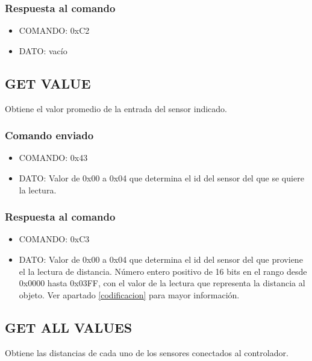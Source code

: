 \documentclass[a4paper,10pt]{article}
\begin{document}
\subsubsection*{Respuesta al comando}

\begin{itemize}
	\item{COMANDO:} 0xC2
	\item{DATO:} vac\'io
\end{itemize}


\subsection{GET VALUE}
\label{get_value_ds}

Obtiene el valor promedio de la entrada del sensor indicado.

\subsubsection*{Comando enviado}

\begin{itemize}
	\item{COMANDO:} 0x43
	\item{DATO:} Valor de 0x00 a 0x04 que determina el id del sensor del que se quiere la lectura.
\end{itemize}

\subsubsection*{Respuesta al comando}

\begin{itemize}
	\item{COMANDO:} 0xC3
	\item{DATO:} Valor de 0x00 a 0x04 que determina el id del sensor del que proviene el la lectura de distancia.
		N\'umero entero positivo de 16 bits en el rango desde 0x0000 hasta 0x03FF, con el valor de la lectura que representa la distancia al objeto.
		Ver apartado \ref{codificacion} para mayor informaci\'on.

\end{itemize}

\subsection{GET ALL VALUES}
\label{get_all_values_ds}

Obtiene las distancias de cada uno de los sensores conectados al controlador.
\end{document}
